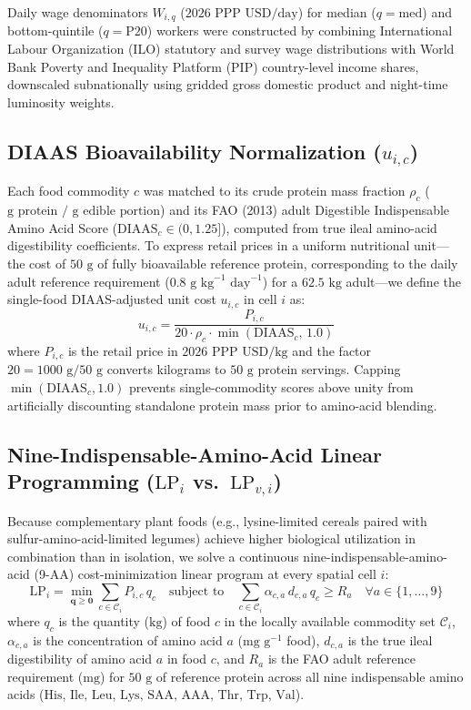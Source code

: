 \documentclass[11pt,a4paper]{article}
\begin{document}
Daily wage denominators $W_{i,q}$ ($2026\text{ PPP USD/day}$) for median ($q = \text{med}$) and bottom-quintile ($q = \text{P20}$) workers were constructed by combining International Labour Organization (ILO) statutory and survey wage distributions with World Bank Poverty and Inequality Platform (PIP) country-level income shares, downscaled subnationally using gridded gross domestic product and night-time luminosity weights.

\subsection{DIAAS Bioavailability Normalization ($u_{i,c}$)}
Each food commodity $c$ was matched to its crude protein mass fraction $\rho_c$ ($\text{g protein / g edible portion}$) and its FAO (2013) adult Digestible Indispensable Amino Acid Score ($\text{DIAAS}_c \in (0, 1.25]$), computed from true ileal amino-acid digestibility coefficients. To express retail prices in a uniform nutritional unit---the cost of $50\text{ g}$ of fully bioavailable reference protein, corresponding to the daily adult reference requirement ($0.8\text{ g kg}^{-1}\text{ day}^{-1}$) for a $62.5\text{ kg}$ adult---we define the single-food DIAAS-adjusted unit cost $u_{i,c}$ in cell $i$ as:
\begin{equation}
u_{i,c} = \frac{P_{i,c}}{20 \cdot \rho_c \cdot \min(\text{DIAAS}_c,\, 1.0)}
\label{eq:diaas_unit}
\end{equation}
where $P_{i,c}$ is the retail price in $2026\text{ PPP USD/kg}$ and the factor $20 = 1000\text{ g}/50\text{ g}$ converts kilograms to $50\text{ g}$ protein servings. Capping $\min(\text{DIAAS}_c, 1.0)$ prevents single-commodity scores above unity from artificially discounting standalone protein mass prior to amino-acid blending.

\subsection{Nine-Indispensable-Amino-Acid Linear Programming ($\text{LP}_i$ vs.\ $\text{LP}_{v,i}$)}
Because complementary plant foods (e.g., lysine-limited cereals paired with sulfur-amino-acid-limited legumes) achieve higher biological utilization in combination than in isolation, we solve a continuous nine-indispensable-amino-acid (9-AA) cost-minimization linear program at every spatial cell $i$:
\begin{equation}
\text{LP}_i = \min_{\mathbf{q} \ge \mathbf{0}} \sum_{c \in \mathcal{C}_i} P_{i,c}\, q_c \quad \text{subject to} \quad \sum_{c \in \mathcal{C}_i} \alpha_{c,a}\, d_{c,a}\, q_c \ge R_a \quad \forall a \in \{1,\dots,9\}
\label{eq:lp_unconstrained}
\end{equation}
where $q_c$ is the quantity ($\text{kg}$) of food $c$ in the locally available commodity set $\mathcal{C}_i$, $\alpha_{c,a}$ is the concentration of amino acid $a$ ($\text{mg g}^{-1}$ food), $d_{c,a}$ is the true ileal digestibility of amino acid $a$ in food $c$, and $R_a$ is the FAO adult reference requirement ($\text{mg}$) for $50\text{ g}$ of reference protein across all nine indispensable amino acids ($\text{His, Ile, Leu, Lys, SAA, AAA, Thr, Trp, Val}$).
\end{document}
